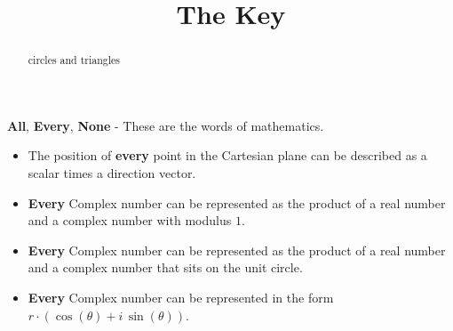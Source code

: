 \documentclass{ximera}
\title{The Key}
\begin{document}
\begin{abstract}
circles and triangles
\end{abstract}
\maketitle





\textbf{\textcolor{red!80!black}{All}}, \textbf{\textcolor{red!80!black}{Every}}, \textbf{\textcolor{red!80!black}{None}} - These are the words of mathematics. 



\begin{itemize}
\item The position of \textbf{\textcolor{red!80!black}{every}} point in the Cartesian plane can be described as a scalar times a direction vector.  

\item \textbf{\textcolor{red!80!black}{Every}} Complex number can be represented as the product of a real number and a complex number with modulus $1$.

\item \textbf{\textcolor{red!80!black}{Every}} Complex number can be represented as the product of a real number and a complex number that sits on the unit circle.

\item \textbf{\textcolor{red!80!black}{Every}} Complex number can be represented in the form \textbf{\textcolor{purple!85!blue}{$r \cdot (\cos(\theta) + i \, \sin(\theta))$}}.
\end{itemize}
\end{document}
